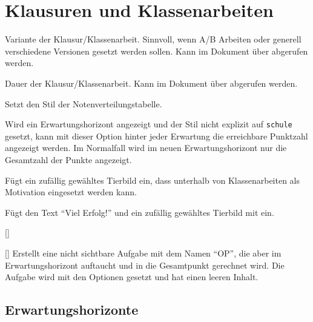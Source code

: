 \section{Klausuren und Klassenarbeiten}

\begin{options}
	Variante der Klausur/Klassenarbeit. Sinnvoll, wenn A/B Arbeiten oder generell verschiedene Versionen gesetzt werden sollen. Kann im Dokument über  abgerufen werden.
	
	Dauer der Klausur/Klassenarbeit. Kann im Dokument über  abgerufen werden.
	
	Setzt den Stil der Notenverteilungstabelle.
	
	Wird ein Erwartungshorizont angezeigt und der Stil nicht explizit auf \texttt{schule} gesetzt, kann mit dieser Option hinter jeder Erwartung die erreichbare Punktzahl angezeigt werden. Im Normalfall wird im neuen Erwartungshorizont nur die Gesamtzahl der Punkte angezeigt.
\end{options}

\begin{commands}
	Fügt ein zufällig gewähltes Tierbild ein, dass unterhalb von Klassenarbeiten als Motivation eingesetzt werden kann.
	
	Fügt den Text \enquote{Viel Erfolg!} und ein zufällig gewähltes Tierbild mit  ein.
	
	[]
	
	[] Erstellt eine nicht sichtbare Aufgabe mit dem Namen \enquote{OP}, die aber im Erwartungshorizont auftaucht und in die Gesamtpunkt gerechnet wird. Die Aufgabe wird mit den Optionen  gesetzt und hat einen leeren Inhalt.
\end{commands}

\subsection{Erwartungshorizonte}